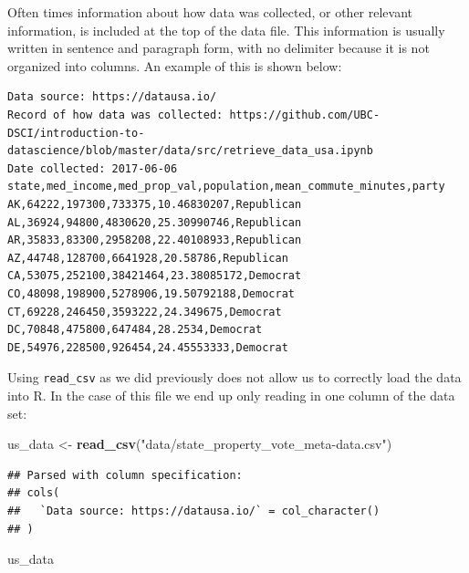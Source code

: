 \documentclass[
]{article}
\newenvironment{Shaded}{\begin{snugshade}}{\end{snugshade}}
\newcommand{\KeywordTok}[1]{\textcolor[rgb]{0.13,0.29,0.53}{\textbf{#1}}}
\newcommand{\NormalTok}[1]{#1}
\newcommand{\StringTok}[1]{\textcolor[rgb]{0.31,0.60,0.02}{#1}}
\begin{document}
Often times information about how data was collected, or other relevant
information, is included at the top of the data file. This information
is usually written in sentence and paragraph form, with no delimiter
because it is not organized into columns. An example of this is shown
below:

\begin{verbatim}
Data source: https://datausa.io/
Record of how data was collected: https://github.com/UBC-DSCI/introduction-to-datascience/blob/master/data/src/retrieve_data_usa.ipynb
Date collected: 2017-06-06
state,med_income,med_prop_val,population,mean_commute_minutes,party
AK,64222,197300,733375,10.46830207,Republican
AL,36924,94800,4830620,25.30990746,Republican
AR,35833,83300,2958208,22.40108933,Republican
AZ,44748,128700,6641928,20.58786,Republican
CA,53075,252100,38421464,23.38085172,Democrat
CO,48098,198900,5278906,19.50792188,Democrat
CT,69228,246450,3593222,24.349675,Democrat
DC,70848,475800,647484,28.2534,Democrat
DE,54976,228500,926454,24.45553333,Democrat
\end{verbatim}

Using \texttt{read\_csv} as we did previously does not allow us to
correctly load the data into R. In the case of this file we end up only
reading in one column of the data set:

\begin{Shaded}
\begin{Highlighting}[]
\NormalTok{us\_data <{-}}\StringTok{ }\KeywordTok{read\_csv}\NormalTok{(}\StringTok{"data/state\_property\_vote\_meta{-}data.csv"}\NormalTok{)}
\end{Highlighting}
\end{Shaded}

\begin{verbatim}
## Parsed with column specification:
## cols(
##   `Data source: https://datausa.io/` = col_character()
## )
\end{verbatim}

\begin{Shaded}
\begin{Highlighting}[]
\NormalTok{us\_data}
\end{Highlighting}
\end{Shaded}
\end{document}
